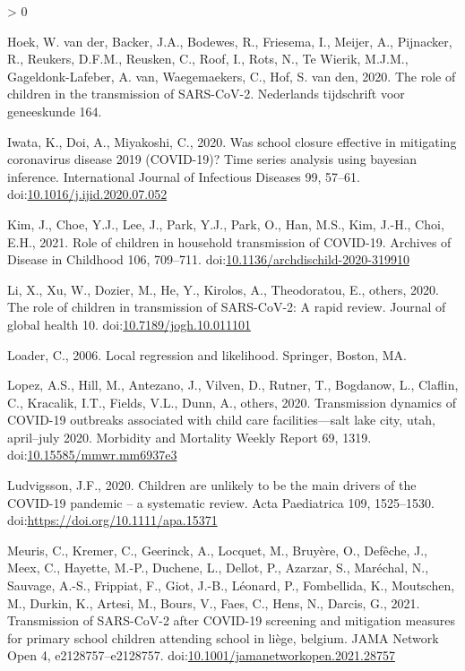 \documentclass[]{elsarticle} %
\newlength{\cslhangindent}
\newenvironment{CSLReferences}[2] %
 {%
  \setlength{\parindent}{0pt}
  \ifodd #1 \everypar{\setlength{\hangindent}{\cslhangindent}}\ignorespaces\fi
  \ifnum #2 > 0
  \setlength{\parskip}{#2\baselineskip}
  \fi
 }%
 {}
\begin{document}
\begin{CSLReferences}{1}{0}
\leavevmode\hypertarget{ref-vanderhoek2020role}{}%
Hoek, W. van der, Backer, J.A., Bodewes, R., Friesema, I., Meijer, A.,
Pijnacker, R., Reukers, D.F.M., Reusken, C., Roof, I., Rots, N., Te
Wierik, M.J.M., Gageldonk-Lafeber, A. van, Waegemaekers, C., Hof, S. van
den, 2020. The role of children in the transmission of SARS-CoV-2.
Nederlands tijdschrift voor geneeskunde 164.

\leavevmode\hypertarget{ref-iwata2020school}{}%
Iwata, K., Doi, A., Miyakoshi, C., 2020. Was school closure effective in
mitigating coronavirus disease 2019 (COVID-19)? Time series analysis
using bayesian inference. International Journal of Infectious Diseases
99, 57--61.
doi:\href{https://doi.org/10.1016/j.ijid.2020.07.052}{10.1016/j.ijid.2020.07.052}

\leavevmode\hypertarget{ref-kim2021role}{}%
Kim, J., Choe, Y.J., Lee, J., Park, Y.J., Park, O., Han, M.S., Kim,
J.-H., Choi, E.H., 2021. Role of children in household transmission of
COVID-19. Archives of Disease in Childhood 106, 709--711.
doi:\href{https://doi.org/10.1136/archdischild-2020-319910}{10.1136/archdischild-2020-319910}

\leavevmode\hypertarget{ref-li2020role}{}%
Li, X., Xu, W., Dozier, M., He, Y., Kirolos, A., Theodoratou, E.,
others, 2020. The role of children in transmission of SARS-CoV-2: A
rapid review. Journal of global health 10.
doi:\href{https://doi.org/10.7189/jogh.10.011101}{10.7189/jogh.10.011101}

\leavevmode\hypertarget{ref-loader2006local}{}%
Loader, C., 2006. Local regression and likelihood. Springer, Boston, MA.

\leavevmode\hypertarget{ref-lopez2020transmission}{}%
Lopez, A.S., Hill, M., Antezano, J., Vilven, D., Rutner, T., Bogdanow,
L., Claflin, C., Kracalik, I.T., Fields, V.L., Dunn, A., others, 2020.
Transmission dynamics of COVID-19 outbreaks associated with child care
facilities---salt lake city, utah, april--july 2020. Morbidity and
Mortality Weekly Report 69, 1319.
doi:\href{https://doi.org/10.15585/mmwr.mm6937e3}{10.15585/mmwr.mm6937e3}

\leavevmode\hypertarget{ref-ludvigsson2020children}{}%
Ludvigsson, J.F., 2020. Children are unlikely to be the main drivers of
the COVID-19 pandemic -- a systematic review. Acta Paediatrica 109,
1525--1530. doi:\url{https://doi.org/10.1111/apa.15371}

\leavevmode\hypertarget{ref-meuris2021transmission}{}%
Meuris, C., Kremer, C., Geerinck, A., Locquet, M., Bruyère, O., Defêche,
J., Meex, C., Hayette, M.-P., Duchene, L., Dellot, P., Azarzar, S.,
Maréchal, N., Sauvage, A.-S., Frippiat, F., Giot, J.-B., Léonard, P.,
Fombellida, K., Moutschen, M., Durkin, K., Artesi, M., Bours, V., Faes,
C., Hens, N., Darcis, G., 2021. Transmission of SARS-CoV-2 after
COVID-19 screening and mitigation measures for primary school children
attending school in liège, belgium. JAMA Network Open 4,
e2128757--e2128757.
doi:\href{https://doi.org/10.1001/jamanetworkopen.2021.28757}{10.1001/jamanetworkopen.2021.28757}


\end{CSLReferences}
\end{document}

